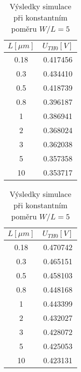 \begin{table}[H]
    \begin{minipage}{0.5\textwidth}
        \centering
        \begin{tabular}{|c|c|}
            \hline
            \(L [\mu m]\) & \(U_{TH0} [V]\) \\ \hline
            0.18	      & 0.417456        \\ \hline
            0.3	          & 0.434410        \\ \hline
            0.5	          & 0.418739        \\ \hline
            0.8	          & 0.396187        \\ \hline
            1	          & 0.386941        \\ \hline
            2	          & 0.368024        \\ \hline
            3	          & 0.362038        \\ \hline
            5	          & 0.357358        \\ \hline
            10	          & 0.353717        \\ \hline
        \end{tabular}

        \vspace{5mm}
    \end{minipage}
    \hfill
    \begin{minipage}{0.5\textwidth}
        \centering
        \begin{tabular}{|c|c|}
            \hline
            \(L [\mu m]\) & \(U_{TH0} [V]\) \\ \hline
            0.18          & 0.470742        \\ \hline
            0.3	          & 0.465151        \\ \hline
            0.5	          & 0.458103        \\ \hline
            0.8	          & 0.448168        \\ \hline
            1             & 0.443399        \\ \hline
            2  	          & 0.432027        \\ \hline
            3  	          & 0.428072        \\ \hline
            5  	          & 0.425053        \\ \hline
            10 	          & 0.423131        \\ \hline
        \end{tabular}

        \vspace{5mm}
    \end{minipage}

    \caption{\label{tab:N_wl_const} Výsledky simulace při konstantním poměru \(W/L = 5\)}
\end{table}
